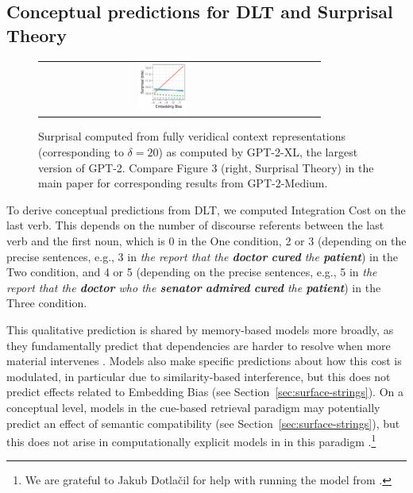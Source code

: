 


\subsection{Conceptual predictions for DLT and Surprisal Theory}

\begin{figure}
    \centering
	\begin{tabular}{cccc}
		\includegraphics[width=0.2\textwidth]{figures/predictions-surprisal-zero_VN_GPT2XL_Bits.pdf} 
	\end{tabular}
	\caption{Surprisal computed from fully veridical context representations (corresponding to $\delta=20$) as computed by GPT-2-XL, the largest version of GPT-2. Compare Figure 3 (right, Surprisal Theory) in the main paper for corresponding results from GPT-2-Medium.}
    \label{fig:zero-noise}
\end{figure}



To derive conceptual predictions from DLT, we computed Integration Cost on the last verb. This depends on the number of discourse referents between the last verb and the first noun, which is 0 in the One condition, 2 or 3 (depending on the precise sentences, e.g., 3 in \textit{the report that the \textbf{doctor} \textbf{cured} the \textbf{patient}}) in the Two condition, and 4 or 5 (depending on the precise sentences, e.g., 5 in \textit{the report that the \textbf{doctor} who the \textbf{senator} \textbf{admired} \textbf{cured} the \textbf{patient}}) in the Three condition.

This qualitative prediction is shared by memory-based models more broadly, as they fundamentally predict that dependencies are harder to resolve when more material intervenes  \citep{mcelree2000sentence,mcelree-memory-2003,lewis2005activation}.
Models also make specific predictions about how this cost is modulated, in particular due to similarity-based interference, but this does not predict effects related to Embedding Bias (see Section~\ref{sec:surface-strings}).
On a conceptual level, models in the cue-based retrieval paradigm may potentially predict an effect of semantic compatibility (see Section~\ref{sec:surface-strings}), but this does not arise in computationally explicit models in in this paradigm \citep{lewis2005activation,Rasmussen2018LeftCornerPW,Dotlacil2020Parsing}.\footnote{We are grateful to Jakub Dotla{\v c}il for help with running the model from \citet{Dotlacil2020Parsing}.}


